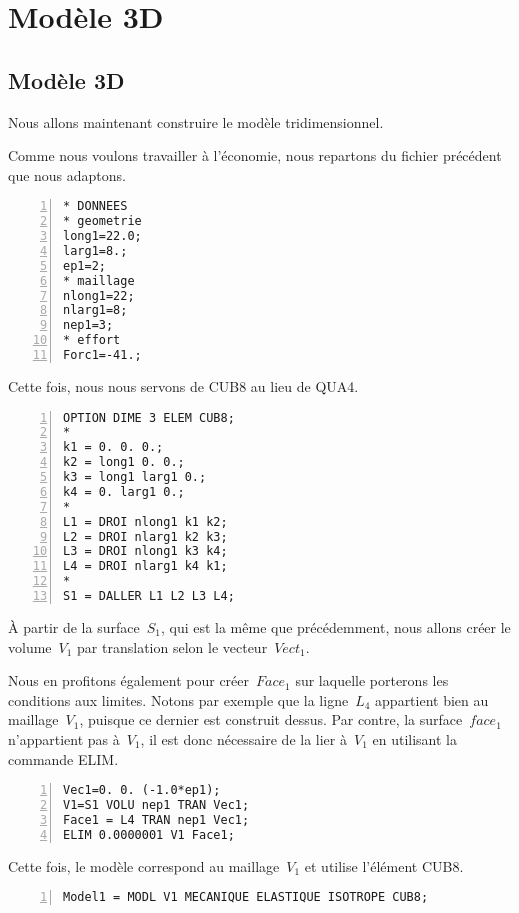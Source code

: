 \medskip
\ifVersionAvecExemplesSepares
  \section{Modèle 3D}
\else
  \subsection{Modèle 3D}
\fi

Nous allons maintenant construire le modèle tridimensionnel.

Comme nous voulons travailler à l'économie, nous repartons du fichier précédent que nous adaptons.

\begin{Verbatim}[numbers=left,numbersep=3pt]
* DONNEES
* geometrie
long1=22.0;
larg1=8.;
ep1=2;
* maillage
nlong1=22;
nlarg1=8;
nep1=3;
* effort
Forc1=-41.;
\end{Verbatim}

\medskip
Cette fois, nous nous servons de CUB8 au lieu de QUA4.

\begin{Verbatim}[numbers=left,numbersep=3pt,firstnumber=last]
OPTION DIME 3 ELEM CUB8;
*
k1 = 0. 0. 0.;
k2 = long1 0. 0.;
k3 = long1 larg1 0.;
k4 = 0. larg1 0.;
*
L1 = DROI nlong1 k1 k2;
L2 = DROI nlarg1 k2 k3;
L3 = DROI nlong1 k3 k4;
L4 = DROI nlarg1 k4 k1;
*
S1 = DALLER L1 L2 L3 L4;
\end{Verbatim}

\medskip
À partir de la surface~$S_1$, qui est la même que précédemment, nous allons créer le volume~$V_1$ par translation
selon le vecteur~$Vect_1$.

Nous en profitons également pour créer~$Face_1$ sur laquelle porterons les conditions aux limites.
Notons par exemple que la ligne~$L_4$ appartient bien au maillage~$V_1$, puisque ce dernier est construit dessus.
Par contre, la surface~$face_1$ n'appartient pas à~$V_1$, il est donc nécessaire de la lier à~$V_1$ en utilisant
la commande ELIM.

\begin{Verbatim}[numbers=left,numbersep=3pt,firstnumber=last]
Vec1=0. 0. (-1.0*ep1);
V1=S1 VOLU nep1 TRAN Vec1;
Face1 = L4 TRAN nep1 Vec1;
ELIM 0.0000001 V1 Face1;
\end{Verbatim}

\medskip
Cette fois, le modèle correspond au maillage~$V_1$ et utilise l'élément CUB8.

\begin{Verbatim}[numbers=left,numbersep=3pt,firstnumber=last]
Model1 = MODL V1 MECANIQUE ELASTIQUE ISOTROPE CUB8;
\end{Verbatim}

